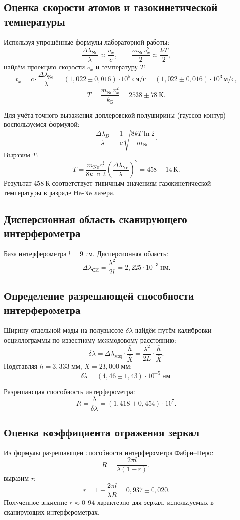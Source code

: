 \documentclass[a4paper]{article}
\begin{document}
\subsection{Оценка скорости атомов и газокинетической температуры}
Используя упрощённые формулы лабораторной работы:
\[
\frac{\Delta\lambda_{\text{Ne}}}{\lambda} \approx \frac{v_x}{c},\qquad \frac{m_{\text{Ne}} v_x^2}{2} \approx \frac{kT}{2},
\]
найдём проекцию скорости $v_x$ и температуру $T$:
\[
v_x = c\cdot\frac{\Delta\lambda_{\text{Ne}}}{\lambda} = (1{,}022 \pm 0{,}016)\cdot10^5\ \text{см/с} = (1{,}022 \pm 0{,}016)\cdot10^3\ \text{м/с},
\]
\[
T = \frac{m_{\text{Ne}} v_x^2}{k_{\text{Б}}} = 2538 \pm 78\ \text{К}.
\]

Для учёта точного выражения доплеровской полуширины (гауссов контур) воспользуемся формулой:
\[
\frac{\Delta\lambda_D}{\lambda} = \frac{1}{c}\sqrt{\frac{8kT\ln 2}{m_{\text{Ne}}}}.
\]
Выразим $T$:
\[
T = \frac{m_{\text{Ne}} c^2}{8k\ln2}\left(\frac{\Delta\lambda_{\text{Ne}}}{\lambda}\right)^2 = 458 \pm 14\ \text{К}.
\]
Результат $458\ \text{К}$ соответствует типичным значениям газокинетической температуры в разряде He-Ne лазера.

\subsection{Дисперсионная область сканирующего интерферометра}
База интерферометра $l = 9$ см. Дисперсионная область:
\[
\Delta\lambda_{\text{СИ}} = \frac{\lambda^2}{2l} = 2{,}225\cdot10^{-3}\ \text{нм}.
\]

\subsection{Определение разрешающей способности интерферометра}
Ширину отдельной моды на полувысоте $\delta\lambda$ найдём путём калибровки осциллограммы по известному межмодовому расстоянию:
\[
\delta\lambda = \Delta\lambda_{\text{мод}} \cdot \frac{\overline{h}}{\overline{X}} = \frac{\lambda^2}{2L}\cdot\frac{\overline{h}}{\overline{X}}.
\]
Подставляя $\overline{h}=3{,}333$ мм, $\overline{X}=23{,}000$ мм:
\[
\delta\lambda = (4{,}46 \pm 1{,}43)\cdot10^{-5}\ \text{нм}.
\]

Разрешающая способность интерферометра:
\[
R = \frac{\lambda}{\delta\lambda} = (1{,}418 \pm 0{,}454)\cdot10^7.
\]

\subsection{Оценка коэффициента отражения зеркал}
Из формулы разрешающей способности интерферометра Фабри–Перо:
\[
R = \frac{2\pi l}{\lambda(1-r)},
\]
выразим $r$:
\[
r = 1 - \frac{2\pi l}{\lambda R} = 0{,}937 \pm 0{,}020.
\]
Полученное значение $r\approx0{,}94$ характерно для зеркал, используемых в сканирующих интерферометрах.
\end{document}

